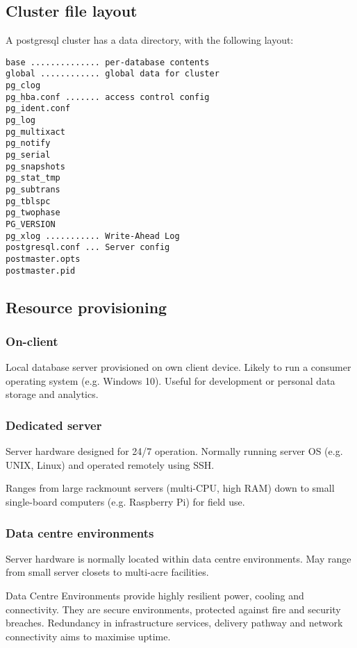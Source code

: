 \subsection{Cluster file layout}

A postgresql cluster has a data directory, with the following layout:

\begin{verbatim}
base .............. per-database contents
global ............ global data for cluster
pg_clog
pg_hba.conf ....... access control config
pg_ident.conf
pg_log
pg_multixact
pg_notify
pg_serial
pg_snapshots
pg_stat_tmp
pg_subtrans
pg_tblspc
pg_twophase
PG_VERSION
pg_xlog ........... Write-Ahead Log
postgresql.conf ... Server config
postmaster.opts
postmaster.pid

\end{verbatim}


\subsection{Resource provisioning}

\subsubsection{On-client} 

Local database server provisioned on own client device.
Likely to run a consumer operating system (e.g. Windows 10). 
Useful for development or personal data storage and analytics.

\subsubsection{Dedicated server} 

Server hardware designed for 24/7 operation.
Normally running server OS (e.g. UNIX, Linux) and operated remotely using SSH.

Ranges from large rackmount servers (multi-CPU, high RAM) down to  small single-board computers (e.g. Raspberry Pi) for field use. 

\subsubsection{Data centre environments}

Server hardware is normally located within data centre environments.
May range from small server closets to multi-acre facilities.
 
Data Centre Environments provide highly resilient power, cooling and connectivity.
They are secure environments, protected against fire and security breaches.
Redundancy in infrastructure services, delivery pathway and network connectivity aims to maximise uptime.

